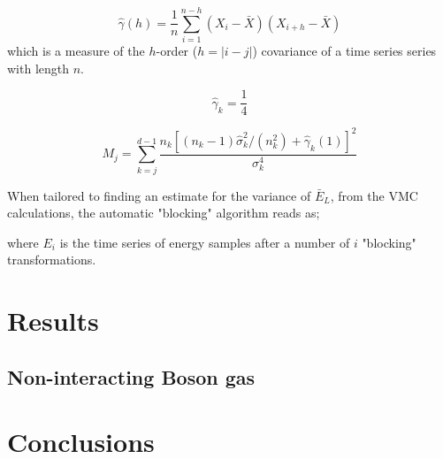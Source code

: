 \documentclass[%
oneside,                 %
final,                   %
10pt]{article}
\begin{document}
\begin{equation}
\hat \gamma(h)=\frac{1}{n} \sum_{i=1}^{n-h} (X_i-\bar X)(X_{i+h}-\bar X) 
\label{eq:samplecovar}
\end{equation}
which is a measure of the $h$-order ($h=|i-j|$) covariance of a time series series with length $n$. 

\begin{equation}
\hat \gamma_k=\frac{1}{4}
\end{equation}


\begin{equation}
M_j=\sum_{k=j}^{d-1} \frac{n_k\left[(n_k-1)\hat \sigma_k^2/(n_k^2)+\hat \gamma_k(1)\right]^2}{\sigma_k^4}
\label{eq:M}
\end{equation}

When tailored to finding an estimate for the variance of $\bar E_L$, from the VMC calculations, the automatic "blocking" algorithm reads as;
\begin{center}\end{center}
where $E_i$ is the time series of energy samples after a number of $i$ "blocking" transformations.


\section{Results} \label{results}
\subsection{Non-interacting Boson gas}

\section{Conclusions} \label{conclusions}
\end{document}
